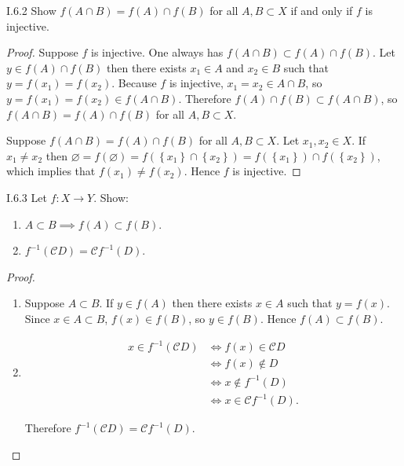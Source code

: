 \begin{problem}{I.6.2}
Show \( f(A\cap B) = f(A) \cap f(B) \) for all \( A, B \subset X \) if and only if \( f \) is injective.
\end{problem}

\begin{proof}
	Suppose \( f \) is injective. One always has \( f(A \cap B) \subset f(A) \cap f(B) \). Let \( y \in f(A) \cap f(B) \) then there exists \( x_{1} \in A \) and \( x_{2} \in B \) such that \( y = f(x_{1}) = f(x_{2}) \). Because \( f \) is injective, \( x_{1} = x_{2} \in A \cap B \), so \( y = f(x_{1}) = f(x_{2}) \in f(A \cap B) \). Therefore \( f(A) \cap f(B) \subset f(A \cap B) \), so \( f(A \cap B) = f(A) \cap f(B) \) for all \( A, B \subset X \).

	Suppose \( f(A\cap B) = f(A) \cap f(B) \) for all \( A, B \subset X \). Let \( x_{1}, x_{2} \in X \). If \( x_{1} \ne x_{2} \) then \( \varnothing = f(\varnothing) = f(\left\{ x_{1} \right\} \cap \left\{ x_{2} \right\}) = f(\left\{ x_{1} \right\}) \cap f(\left\{ x_{2} \right\}) \), which implies that \( f(x_{1}) \ne f(x_{2}) \). Hence \( f \) is injective.
\end{proof}

\begin{problem}{I.6.3}
Let \( f: X \to Y \). Show:
\begin{enumerate}[label={(\alph*)}]
	\item \( A \subset B \implies f(A) \subset f(B) \).
	\item \( f^{-1}(\mathscr{C}D) = \mathscr{C}f^{-1}(D) \).
\end{enumerate}
\end{problem}

\begin{proof}
	\begin{enumerate}[label={(\alph*)},leftmargin=*]
		\item Suppose \( A \subset B \). If \( y \in f(A) \) then there exists \( x \in A \) such that \( y = f(x) \). Since \( x \in A \subset B \), \( f(x) \in f(B) \), so \( y \in f(B) \). Hence \( f(A) \subset f(B) \).
		\item \begingroup
		      \allowdisplaybreaks%
		      \begin{align*}
			      x \in f^{-1}(\mathscr{C}D) & \iff f(x) \in \mathscr{C}D       \\
			                                 & \iff f(x) \notin D               \\
			                                 & \iff x \notin f^{-1}(D)          \\
			                                 & \iff x \in \mathscr{C}f^{-1}(D).
		      \end{align*}
		      \endgroup

		      Therefore \( f^{-1}(\mathscr{C}D) = \mathscr{C}f^{-1}(D) \).
	\end{enumerate}
\end{proof}

